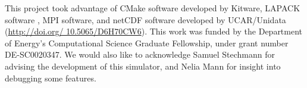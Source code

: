 This project took advantage of CMake software developed by Kitware, LAPACK software \cite{Anderson99}, MPI software, and netCDF software developed by UCAR/Unidata (\href{http://doi.org/10.5065/D6H70CW6}{http://doi.org/ 10.5065/D6H70CW6}). This work was funded by the Department of Energy's Computational Science Graduate Fellowship, under grant number DE-SC0020347. We would also like to acknowledge Samuel Stechmann for advising the development of this simulator, and Nelia Mann for insight into debugging some features.